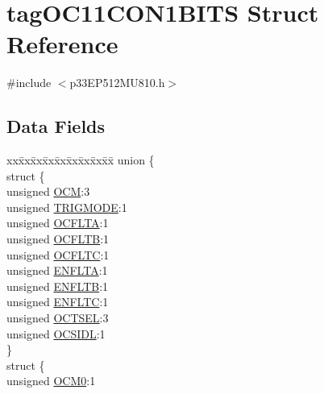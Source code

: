 \hypertarget{structtag_o_c11_c_o_n1_b_i_t_s}{}\section{tag\+O\+C11\+C\+O\+N1\+B\+I\+TS Struct Reference}
\label{structtag_o_c11_c_o_n1_b_i_t_s}


{\ttfamily \#include $<$p33\+E\+P512\+M\+U810.\+h$>$}

\subsection*{Data Fields}
\begin{DoxyCompactItemize}
\item 
\begin{tabbing}
xx\=xx\=xx\=xx\=xx\=xx\=xx\=xx\=xx\=\kill
union \{\\
\>struct \{\\
\>\>unsigned \hyperlink{structtag_o_c11_c_o_n1_b_i_t_s_a778fa0cf51a9477ac4e82d71a8733801}{OCM}:3\\
\>\>unsigned \hyperlink{structtag_o_c11_c_o_n1_b_i_t_s_a7a0057e0dca6e2663584b5b9e1da04c3}{TRIGMODE}:1\\
\>\>unsigned \hyperlink{structtag_o_c11_c_o_n1_b_i_t_s_acc967e41cecdeedc6ad4422f9ef1a6a3}{OCFLTA}:1\\
\>\>unsigned \hyperlink{structtag_o_c11_c_o_n1_b_i_t_s_a1fb30bb4421ef7c4bd0c66c379875593}{OCFLTB}:1\\
\>\>unsigned \hyperlink{structtag_o_c11_c_o_n1_b_i_t_s_a69a1772a4144abd579d17d28445b9934}{OCFLTC}:1\\
\>\>unsigned \hyperlink{structtag_o_c11_c_o_n1_b_i_t_s_a1e0f05fb23d516e003e4713fe8c1498a}{ENFLTA}:1\\
\>\>unsigned \hyperlink{structtag_o_c11_c_o_n1_b_i_t_s_a9d7aa97d5328b8b81ab7fd9145dfa0fc}{ENFLTB}:1\\
\>\>unsigned \hyperlink{structtag_o_c11_c_o_n1_b_i_t_s_a0b6f25c0f83f33b5501b6a2e6141a6ef}{ENFLTC}:1\\
\>\>unsigned \hyperlink{structtag_o_c11_c_o_n1_b_i_t_s_ae37d2a41dae2d2af1d82f7caae33cadb}{OCTSEL}:3\\
\>\>unsigned \hyperlink{structtag_o_c11_c_o_n1_b_i_t_s_afd05f4f249db4ef69b684e2f3fa6b703}{OCSIDL}:1\\
\>\} \\
\>struct \{\\
\>\>unsigned \hyperlink{structtag_o_c11_c_o_n1_b_i_t_s_a9271e84c9759ff10a7bc1cee3276e8f6}{OCM0}:1\\

\end{tabbing}
\end{DoxyCompactItemize}
